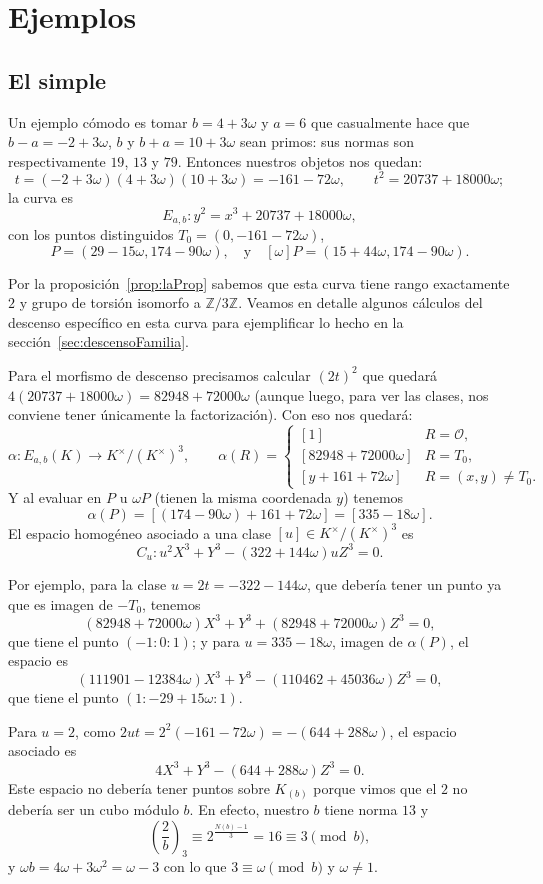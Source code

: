 \documentclass[a4paper]{book}
\theoremstyle{definition}
\theoremstyle{plain}
\newcommand{\ZZ}{\mathbb{Z}}
\newcommand{\OO}{\mathcal{O}}
\newcommand{\KmodT}{K^\times/{(K^\times)}^3}
\newcommand{\cub}[2]{\left(\frac{#1}{#2}\right)_3}
\begin{document}
\section{Ejemplos}

\subsection*{El simple}

Un ejemplo cómodo es tomar $b=4+3\omega$ y $a=6$ que casualmente hace que $b-a = -2+3\omega$, $b$ y $b+a = 10+3\omega$ sean primos: sus normas son respectivamente $19$, $13$ y $79$. Entonces nuestros objetos nos quedan:
\[
t= (-2+3\omega)(4+3\omega)(10+3\omega) = -161-72\omega, \qquad t^2=20737+18000\omega;
\]
la curva es 
\[
E_{a,b} : y^2=x^3+20737+18000\omega,
\]
con los puntos distinguidos $T_0= (0, -161-72\omega)$,
\[
P=(29-15\omega,174-90\omega), \quad \text{y}\quad [\omega]P =(15+44\omega,174-90\omega).
\]

Por la proposición~\ref{prop:laProp} sabemos que esta curva tiene rango exactamente $2$ y grupo de torsión isomorfo a $\ZZ/3\ZZ$. Veamos en detalle algunos cálculos del descenso específico en esta curva para ejemplificar lo hecho en la sección~\ref{sec:descensoFamilia}.

Para el morfismo de descenso precisamos calcular ${(2t)}^2$ que quedará $4(20737+18000\omega) = 82948+72000\omega$ (aunque luego, para ver las clases, nos conviene tener únicamente la factorización). Con eso nos quedará:
\[
\alpha:E_{a,b}(K)\longrightarrow\KmodT,\qquad \alpha(R)=
\begin{cases}
[1] & R=\OO,\\
[82948+72000\omega] & R=T_0,\\
[y+161+72\omega] & R=(x,y)\neq T_0.
\end{cases}
\]
Y al evaluar en $P$ u $\omega P$ (tienen la misma coordenada $y$) tenemos 
\[
\alpha(P) = [(174-90\omega)+161+72\omega] = [335-18\omega].
\]
El espacio homogéneo asociado a una clase $[u] \in\KmodT$ es 
\[
C_u: u^2X^3+Y^3-(322+144\omega)uZ^3=0.
\]

Por ejemplo, para la clase $u=2t=-322-144\omega$, que debería tener un punto ya que es imagen de $-T_0$, tenemos
\[
(82948+72000\omega)X^3+Y^3 +(82948+72000\omega)Z^3=0,
\]
que tiene el punto $(-1:0:1)$; y para $u=335-18\omega$, imagen de $\alpha(P)$, el espacio es 
\[
(111901-12384\omega)X^3+Y^3 -(110462+45036\omega)Z^3=0,
\]
que tiene el punto $(1:-29+15\omega:1)$.

Para $u=2$, como $2ut=2^2(-161-72\omega)= -(644+288\omega)$, el espacio asociado es
\[
4X^3+Y^3-(644+288\omega)Z^3=0.
\]
Este espacio no debería tener puntos sobre $K_{(b)}$ porque vimos que el $2$ no debería ser un cubo módulo $b$. En efecto, nuestro $b$ tiene norma $13$ y 
\[
\cub{2}{b} \equiv 2^{\frac{N(b)-1}{3}} = 16 \equiv 3 \pmod b,
\]
y $\omega b = 4\omega + 3\omega^2 = \omega -3$ con lo que $3\equiv\omega\pmod b$ y $\omega\neq 1$.
\end{document}
